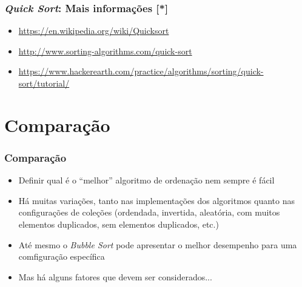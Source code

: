 \documentclass[aspectratio=169]{beamer}
\begin{document}
\begin{frame}[fragile]\frametitle{\emph{Quick Sort}: Mais informações [*]}
\begin{itemize}
	\item \url{https://en.wikipedia.org/wiki/Quicksort}
	\item \url{http://www.sorting-algorithms.com/quick-sort}
	\item \url{https://www.hackerearth.com/practice/algorithms/sorting/quick-sort/tutorial/}
\end{itemize}
\end{frame}

\section{Comparação}

\begin{frame}[fragile]\frametitle{Comparação}
\begin{itemize}
	\item Definir qual é o ``melhor'' algoritmo de ordenação nem sempre é fácil
	\item Há muitas variações, tanto nas implementações dos algoritmos quanto nas configurações de coleções (ordendada, invertida, aleatória, com muitos elementos duplicados, sem elementos duplicados, etc.)
	\item Até mesmo o \emph{Bubble Sort} pode apresentar o melhor desempenho para uma comfiguração específica
	\item Mas há alguns fatores que devem ser considerados...
\end{itemize}
\end{frame}
\end{document}
